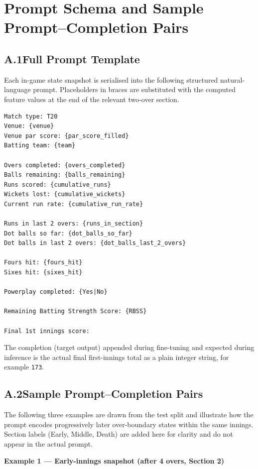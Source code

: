 \chapter{Prompt Schema and Sample Prompt--Completion Pairs}
\label{app:prompt_schema}

\section*{A.1\quad Full Prompt Template}

Each in-game state snapshot is serialised into the following structured natural-language prompt. Placeholders in braces are substituted with the computed feature values at the end of the relevant two-over section.

\begin{verbatim}
Match type: T20
Venue: {venue}
Venue par score: {par_score_filled}
Batting team: {team}

Overs completed: {overs_completed}
Balls remaining: {balls_remaining}
Runs scored: {cumulative_runs}
Wickets lost: {cumulative_wickets}
Current run rate: {cumulative_run_rate}

Runs in last 2 overs: {runs_in_section}
Dot balls so far: {dot_balls_so_far}
Dot balls in last 2 overs: {dot_balls_last_2_overs}

Fours hit: {fours_hit}
Sixes hit: {sixes_hit}

Powerplay completed: {Yes|No}

Remaining Batting Strength Score: {RBSS}

Final 1st innings score:
\end{verbatim}

The completion (target output) appended during fine-tuning and expected during inference is the actual final first-innings total as a plain integer string, for example \texttt{173}.

\section*{A.2\quad Sample Prompt--Completion Pairs}

The following three examples are drawn from the test split and illustrate how the prompt encodes progressively later over-boundary states within the same innings. Section labels (Early, Middle, Death) are added here for clarity and do not appear in the actual prompt.

\bigskip
\noindent\textbf{Example 1 — Early-innings snapshot (after 4 overs, Section 2)}

